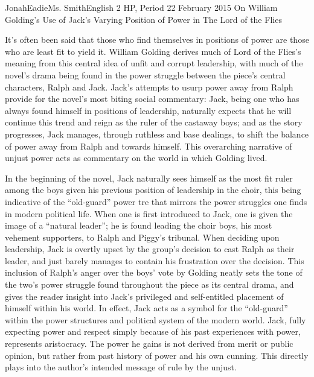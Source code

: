 \documentclass[12pt,letterpaper]{article}
\begin{document}
\begin{mla}{Jonah}{Eadie}{Ms. Smith}{English 2 HP, Period 2}{2 February 2015}
{On William Golding's Use of Jack's Varying Position of Power in The Lord of
the Flies}

It’s often been said that those who find themselves in positions of power are 
those who are least fit to yield it. William Golding derives much of Lord of 
the Flies’s meaning from this central idea of unfit and corrupt leadership, 
with much of the novel’s drama being found in the power struggle between the 
piece’s central characters, Ralph and Jack. Jack’s attempts to usurp power 
away from Ralph provide for the novel’s most biting social commentary: Jack, 
being one who has always found himself in positions of leadership, naturally 
expects that he will continue this trend and reign as the ruler of the 
castaway boys; and as the story progresses, Jack manages, through ruthless and 
base dealings, to shift the balance of power away from Ralph and towards 
himself. This overarching narrative of unjust power acts as commentary on the 
world in which Golding lived.

In the beginning of the novel, Jack naturally sees himself as the most fit 
ruler among the boys given his previous position of leadership in the choir, 
this being indicative of the “old-guard” power tre that mirrors the power 
struggles one finds in modern political life. When one is first introduced to 
Jack, one is given the image of a “natural leader”; he is found leading the 
choir boys, his most vehement supporters, to Ralph and Piggy’s tribunal. When 
deciding upon leadership, Jack is overtly upset by the group’s decision to 
cast Ralph as their leader, and just barely manages to contain his frustration 
over the decision. This inclusion of Ralph’s anger over the boys’ vote by 
Golding neatly sets the tone of the two’s power struggle found throughout the 
piece as its central drama, and gives the reader insight into Jack’s 
privileged and self-entitled placement of himself within his world. In effect, 
Jack acts as a symbol for the “old-guard” within the power structures and 
political system of the modern world. Jack, fully expecting power and respect 
simply because of his past experiences with power, represents aristocracy. The 
power he gains is not derived from merit or public opinion, but rather from 
past history of power and his own cunning. This directly plays into the 
author’s intended message of rule by the unjust.


\end{mla}
\end{document}
